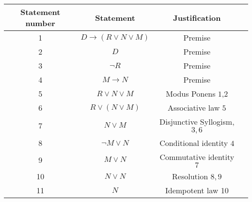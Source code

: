 \documentclass[11pt]{article}
\newcounter{pgpts}
\newcounter{cumpts}
\newcommand{\cnewpage}{\addtocounter{cumpts}{\value{pgpts}}\newpage\setcounter{pgpts}{0}}
\begin{document}
\begin{center}
{\Large
\begin{tabular}{|c|c|c|c|}
    Statement number & Statement & Justification
    &\hspace*{7cm}\\\hline
    1& $D\to (R \vee N \vee M)$ & Premise\\
    2& $D$ & Premise\\
    3 & $\neg R$ & Premise \\
    4 & $M\to N$ & Premise \\
    5 & $R\vee N \vee M$ & Modus Ponens $1$,$2$\\
    6 & $R\vee (N \vee M)$ & Associative law $5$\\
    7 & $N\vee M$ & Disjunctive Syllogism, $3,6$\\
    8 & $\neg M \vee N$ & Conditional identity $4$\\
    9 & $M\vee N $ & Commutative identity $7$ & \\
    10 & $N \vee N$ & Resolution $8,9$ & \\
    11 & $N$ & Idempotent law 10\\
\end{tabular}
}
\end{center}
\cnewpage




\end{document}
